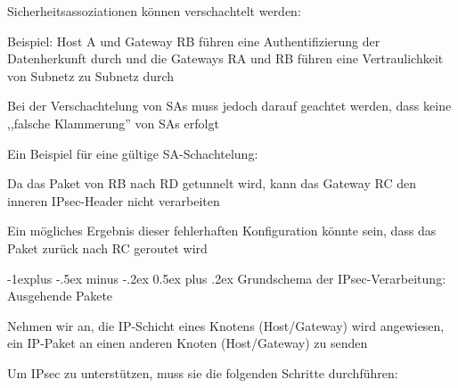 \documentclass[a4paper]{article}
\makeatletter
\renewcommand{\subsection}{\@startsection{subsection}{2}{0mm}%
 {-1explus -.5ex minus -.2ex}%
 {0.5ex plus .2ex}%
 {\normalfont\normalsize\bfseries}}
\makeatother
\begin{document}
\begin{multicols}{3}
      \begin{itemize*}
            \item Sicherheitsassoziationen können verschachtelt werden:
            \begin{itemize*}
                  \item Beispiel: Host A und Gateway RB führen eine Authentifizierung der Datenherkunft durch und die Gateways RA und RB führen eine Vertraulichkeit von Subnetz zu Subnetz durch
            \end{itemize*}
            \item Bei der Verschachtelung von SAs muss jedoch darauf geachtet werden, dass keine ,,falsche Klammerung'' von SAs erfolgt
            \begin{itemize*}
                  \item Ein Beispiel für eine gültige SA-Schachtelung:
                  \item Da das Paket von RB nach RD getunnelt wird, kann das Gateway RC den inneren IPsec-Header nicht verarbeiten
                  \item Ein mögliches Ergebnis dieser fehlerhaften Konfiguration könnte sein, dass das Paket zurück nach RC geroutet wird
            \end{itemize*}
      \end{itemize*}


      \subsection{Grundschema der IPsec-Verarbeitung: Ausgehende
            Pakete}

      \begin{itemize*}
            \item
            Nehmen wir an, die IP-Schicht eines Knotens (Host/Gateway) wird
            angewiesen, ein IP-Paket an einen anderen Knoten (Host/Gateway) zu
            senden
            \item
            Um IPsec zu unterstützen, muss sie die folgenden Schritte durchführen:


\end{itemize*}
\end{multicols}
\end{document}

